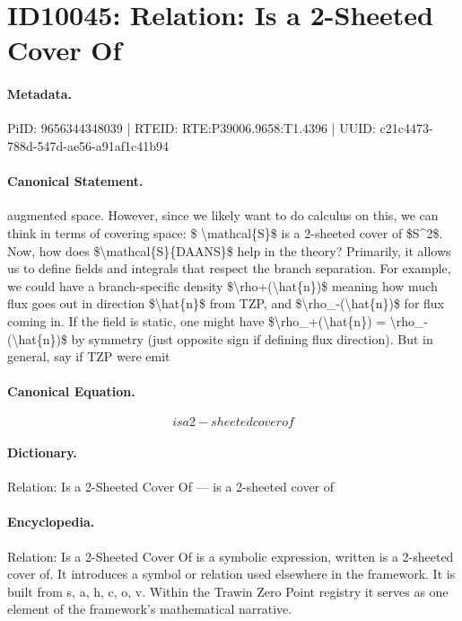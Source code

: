 \section*{ID10045: Relation: Is a 2-Sheeted Cover Of}
\paragraph{Metadata.}
PiID: 9656344348039 | RTEID: RTE:P39006.9658:T1.4396 | UUID: c21c4473-788d-547d-ae56-a91af1c41b94

\paragraph{Canonical Statement.}
augmented space. However, since we likely want to do calculus on this, we can think in terms of covering space: \$ \textbackslash{}mathcal\{S\}\$ is a 2-sheeted cover of \$S\textasciicircum{}2\$. Now, how does \$\textbackslash{}mathcal\{S\}\{DAANS\}\$ help in the theory? Primarily, it allows us to define fields and integrals that respect the branch separation. For example, we could have a branch-specific density \$\textbackslash{}rho+(\textbackslash{}hat\{n\})\$ meaning how much flux goes out in direction \$\textbackslash{}hat\{n\}\$ from TZP, and \$\textbackslash{}rho\_-(\textbackslash{}hat\{n\})\$ for flux coming in. If the field is static, one might have \$\textbackslash{}rho\_+(\textbackslash{}hat\{n\}) = \textbackslash{}rho\_-(\textbackslash{}hat\{n\})\$ by symmetry (just opposite sign if defining flux direction). But in general, say if TZP were emit

\paragraph{Canonical Equation.}
\[
is a 2-sheeted cover of
\]

\paragraph{Dictionary.}
Relation: Is a 2-Sheeted Cover Of — is a 2-sheeted cover of

\paragraph{Encyclopedia.}
Relation: Is a 2-Sheeted Cover Of is a symbolic expression, written is a 2-sheeted cover of. It introduces a symbol or relation used elsewhere in the framework. It is built from s, a, h, c, o, v. Within the Trawin Zero Point registry it serves as one element of the framework's mathematical narrative.
